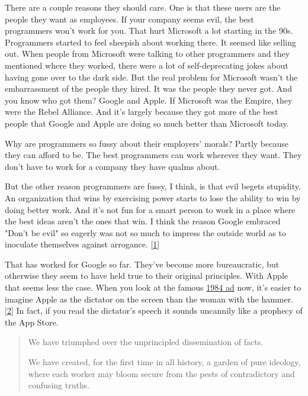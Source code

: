 There are a couple reasons they should
                  care. One is that these users are the people they want as
                  employees. If your company seems evil, the best programmers
                  won't work for you. That hurt Microsoft a lot starting in the
                  90s. Programmers started to feel sheepish about working there.
                  It seemed like selling out. When people from Microsoft were
                  talking to other programmers and they mentioned where they
                  worked, there were a lot of self-deprecating jokes about
                  having gone over to the dark side. But the real problem for
                  Microsoft wasn't the embarrassment of the people they hired.
                  It was the people they never got. And you know who got them?
                  Google and Apple. If Microsoft was the Empire, they were the
                  Rebel Alliance. And it's largely because they got more of the
                  best people that Google and Apple are doing so much better
                  than Microsoft today.

Why are programmers so fussy
                  about their employers' morals? Partly because they can afford
                  to be. The best programmers can work wherever they want. They
                  don't have to work for a company they have qualms about.

But
                  the other reason programmers are fussy, I think, is that evil
                  begets stupidity. An organization that wins by exercising
                  power starts to lose the ability to win by doing better work.
                  And it's not fun for a smart person to work in a place where
                  the best ideas aren't the ones that win. I think the reason
                  Google embraced "Don't be evil" so eagerly was not so much to
                  impress the outside world as to inoculate themselves against
                  arrogance.
                  [\href{\#f1n}{1}]

That has worked for Google so far. They've become
                  more bureaucratic, but otherwise they seem to have held true
                  to their original principles. With Apple that seems less the
                  case. When you look at the famous
                  \href{http://www.uriahcarpenter.info/1984.html}{1984 ad}
                  now, it's easier to imagine Apple as the dictator on the
                  screen than the woman with the hammer.
                  [\href{\#f2n}{2}]
                  In fact, if you read the dictator's speech it sounds uncannily
                  like a prophecy of the App Store.
                  \begin{quote}

                    We have triumphed over the unprincipled dissemination of
                    facts.

We have created, for the first time in all
                    history, a garden of pure ideology, where each worker may
                    bloom secure from the pests of contradictory and confusing
                    truths.
                  
\end{quote}

